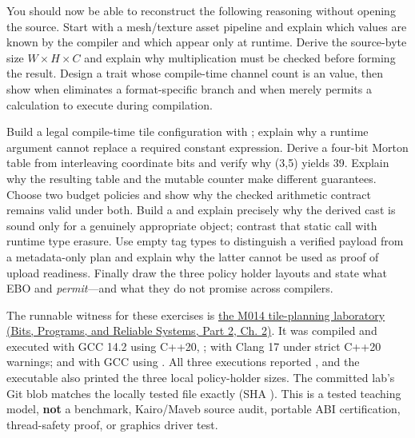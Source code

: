 \hypertarget{01-foundations-i-ch005-a-mastery-test-that-connects-every-mechanism-without-breaking-the-narrative}{}

You should now be able to reconstruct the following reasoning without opening the source. Start with a mesh/texture asset pipeline and explain which values are known by the compiler and which appear only at runtime. Derive the source-byte size \(W\times H\times C\) and explain why multiplication must be checked before forming the result. Design a trait whose compile-time channel count is an  value, then show when  eliminates a format-specific branch and when  merely permits a calculation to execute during compilation.

Build a legal compile-time tile configuration with ; explain why a runtime argument cannot replace a required constant expression. Derive a four-bit Morton table from interleaving coordinate bits and verify why (3,5) yields 39. Explain why the resulting  table and the  mutable counter make different guarantees. Choose two budget policies and show why the checked arithmetic contract remains valid under both. Build a  and explain precisely why the derived cast is sound only for a genuinely appropriate object; contrast that static call with runtime type erasure. Use empty tag types to distinguish a verified payload from a metadata-only plan and explain why the latter cannot be used as proof of upload readiness. Finally draw the three policy holder layouts and state what EBO and  \emph{permit}---and what they do not promise across compilers.

The runnable witness for these exercises is \href{../01-Bits-Programs-and-Reliable-Systems-P02/main.pdf\#nameddest=source-file-f5eb017280bb6b2ae6b1475d}{the M014 tile-planning laboratory (Bits, Programs, and Reliable Systems, Part 2, Ch. 2)}. It was compiled and executed with GCC 14.2 using C++20, ; with Clang 17 under strict C++20 warnings; and with GCC using . All three executions reported , and the executable also printed the three local policy-holder sizes. The committed lab's Git blob matches the locally tested file exactly (SHA ). This is a tested teaching model, \textbf{not} a benchmark, Kairo/Maveb source audit, portable ABI certification, thread-safety proof, or graphics driver test.

